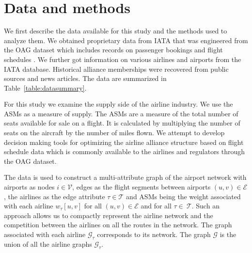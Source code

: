 \documentclass[preprint,times]{elsarticle}
\def\mfabian#1{{\color{black} #1}}
\def\mkhalil#1{{\color{black} #1}}
\begin{document}
\section{Data and methods} \label{sec:background}

We first \mfabian{describe} the data available for this study and the methods used to analyze \mfabian{them}.
We obtained proprietary data from \ac{IATA} that was engineered from the \ac{OAG} dataset which includes records on passenger bookings and flight schedules \citep{OAG}.
We further \mfabian{got} information on various airlines and airports from the \ac{IATA} database.
Historical alliance memberships were \mfabian{recovered} from public sources and news articles.
The data \mfabian{are} summarized in Table~\ref{table:datasummary}.

For this study we examine the supply side of the airline industry. We use the \acp{ASM} as a measure of supply. The \acp{ASM} are a measure of the total number of seats available for sale on a flight. It is calculated by multiplying the number of seats on the aircraft by the number of miles flown. We attempt to develop decision making tools for optimizing the airline alliance structure based on flight schedule data which is commonly available to the airlines and regulators through the \ac{OAG} dataset.

The data is used to construct a multi-attribute graph of the airport network with airports as nodes $i \in \mathcal{V}$, \mkhalil{edges as the flight segments between airports $(u,v) \in \mathcal{E}$,} the airlines as the edge attribute $\tau \in \mathcal{T}$ and \acp{ASM} being the weight associated with each \mkhalil{airline} $w_\tau[u,v]$ for all $(u,v) \in \mathcal{E}$ and for all $\tau\in~\mathcal{T}$. Such an approach allows us to compactly represent the airline network and the competition between the airlines on all the routes in the network. The graph associated with each \mkhalil{airline} $\mathcal{G}_\tau$ corresponds to \mkhalil{its network}. The graph $\mathcal{G}$ is the union of all the airline graphs $\mathcal{G}_\tau$.
\end{document}
